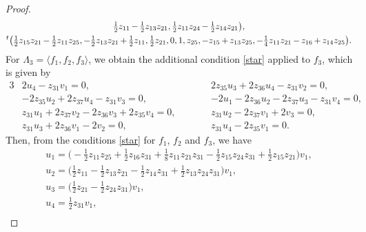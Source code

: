 \documentclass[pdftex]{sigma}
\numberwithin{equation}{section}
\theoremstyle{definition}
\newcommand{\0}{\boldsymbol{0}}
\begin{document}
\begin{proof}
\begin{gather*}
\tfrac{1}{2}z_{11}\hspace{-0.6pt}-\hspace{-0.6pt} \tfrac{1}{2}z_{13}z_{21}, \tfrac{1}{2}z_{11}z_{24} \hspace{-0.6pt}-\hspace{-0.6pt} \tfrac{1}{2}z_{14}z_{21}\bigr),
\\
{}^t\bigl(\tfrac{1}{2}z_{15}z_{21} \hspace{-0.6pt}-\hspace{-0.6pt} \tfrac{1}{2}z_{11}z_{25}, - \tfrac{1}{2}z_{13}z_{21} \hspace{-0.6pt}+\hspace{-0.6pt} \tfrac{1}{2}z_{11},
\tfrac{1}{2}z_{21}, 0, 1, z_{25}, - z_{15} \hspace{-0.6pt}+\hspace{-0.6pt} z_{13}z_{25}, -\tfrac{1}{4}z_{11}z_{21} \hspace{-0.6pt}-\hspace{-0.6pt} z_{16} \hspace{-0.6pt}+\hspace{-0.6pt} z_{14}z_{25}\bigr).
\end{gather*}
For $\Lambda_3 = \langle f_1, f_2, f_3\rangle$, we obtain the additional condition \eqref{star} applied to $f_3$,
which is given by
\begin{alignat*}{3}
&2u_4 - z_{31}v_1 = 0,
\qquad&&
2z_{35}u_3 + 2z_{36}u_4 - z_{31}v_2 = 0,&
\\
&-2 z_{35}u_2 + 2z_{37}u_4 - z_{31}v_3 = 0,
\qquad&&
-2u_1 - 2z_{36}u_2 - 2z_{37}u_3 - z_{31}v_4 = 0,&
\\
&z_{31}u_1 + 2z_{37}v_2 - 2z_{36}v_3 + 2z_{35}v_4 = 0,
\qquad&&
z_{31}u_2 - 2z_{37}v_1 + 2v_3 = 0,&
\\
&z_{31}u_3 + 2z_{36}v_1 - 2v_2 = 0,
\qquad&&
z_{31}u_4 - 2z_{35}v_1 = 0.&
\end{alignat*}
Then, from the conditions \eqref{star} for $f_1$, $f_2$ and $f_3$, we have
\begin{gather*}
u_1 = \biggl(- \frac{1}{2}z_{11}z_{25} + \frac{1}{2}z_{16}z_{31} + \frac{1}{8}z_{11}z_{21}z_{31}
- \frac{1}{2}z_{15}z_{24}z_{31} + \frac{1}{2}z_{15}z_{21}\biggr)v_1,
\\
u_2 = \biggl(\frac{1}{2}z_{11} - \frac{1}{2}z_{13}z_{21} - \frac{1}{2}z_{14}z_{31} + \frac{1}{2}z_{13}z_{24}z_{31}\biggr)v_1,
\\
u_3 = \biggl(\frac{1}{2}z_{21} - \frac{1}{2}z_{24}z_{31}\biggr)v_1,
\\
u_4 = \frac{1}{2}z_{31}v_1,
\\

\end{gather*}
\end{proof}
\end{document}
